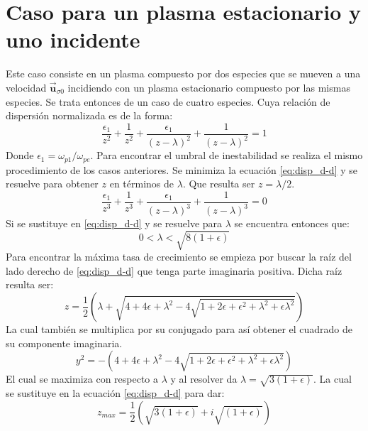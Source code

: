 \documentclass[../tesis_main_file.tex]{subfiles}
\begin{document}
\section{Caso para un plasma estacionario y uno incidente}
Este caso consiste en un plasma compuesto por dos especies que se mueven a una velocidad $\overrightarrow{\textbf{u}}_{\sigma 0}$ incidiendo con un plasma estacionario compuesto por las mismas especies. Se trata entonces de un caso de cuatro especies. Cuya relación de dispersión normalizada es de la forma:
\begin{equation}
\label{eq:disp_d-d}
\frac{\epsilon_1}{z^2}+\frac{1}{z^2}+\frac{\epsilon_1}{(z-\lambda)^2}+\frac{1}{(z-\lambda)^2}=1
\end{equation}
Donde $\epsilon_1 = \omega_{p1}/ \omega_{pe}$. Para encontrar el umbral de inestabilidad se realiza el mismo procedimiento de los casos anteriores. Se minimiza la ecuación \ref{eq:disp_d-d} y se resuelve para obtener $z$ en términos de $\lambda$. Que resulta ser $z=\lambda /2$.
\begin{equation}
\frac{\epsilon_1}{z^3}+\frac{1}{z^3}+\frac{\epsilon_1}{(z-\lambda)^3}+\frac{1}{(z-\lambda)^3}=0
\end{equation}
Si se sustituye en \ref{eq:disp_d-d} y se resuelve para $\lambda$ se encuentra entonces que:
\begin{equation}
0 < \lambda < \sqrt{8(1+\epsilon)}
\end{equation}
Para encontrar la máxima tasa de crecimiento se empieza por buscar la raíz del lado derecho de \ref{eq:disp_d-d} que tenga parte imaginaria positiva. Dicha raíz resulta ser:
\begin{equation}
\label{eq:raiz_d-d}
z =\frac{1}{2}\left(\lambda + \sqrt{4 + 4\epsilon + \lambda ^2 -4\sqrt{1+2\epsilon + \epsilon^2+ \lambda^2 + \epsilon \lambda ^2}} \right)
\end{equation}
La cual también se multiplica por su conjugado para así obtener el cuadrado de su componente imaginaria.
\begin{equation}
y^2 = -\left(4 + 4\epsilon + \lambda ^2 -4\sqrt{1+2\epsilon + \epsilon^2+ \lambda^2 + \epsilon \lambda ^2}\right)
\end{equation}
El cual se maximiza con respecto a $\lambda$ y al resolver da $\lambda = \sqrt{3(1 + \epsilon)}$. La cual se sustituye en la ecuación \ref{eq:disp_d-d} para dar:
\begin{equation}
\label{eq:z-max-d-d}
z_{max} = \frac{1}{2}\left(\sqrt{3(1+\epsilon)} + i \sqrt{(1+\epsilon)} \right)
\end{equation}
\end{document}
